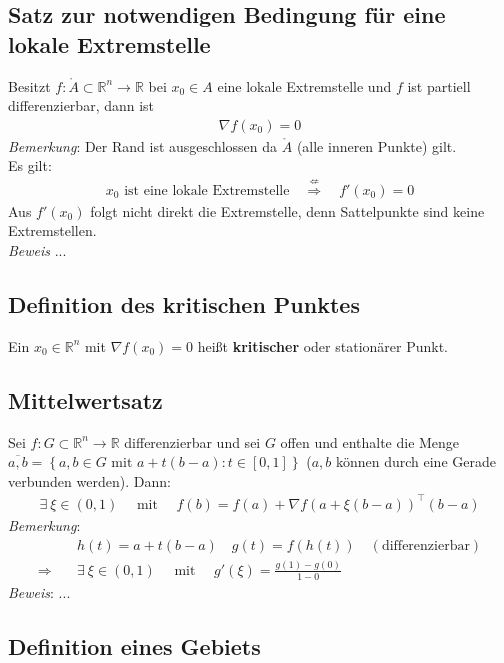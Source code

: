 \documentclass[11pt,a4paper]{book}
\newcommand {\R}	{\mathbb{R}}
\newcommand {\Rn}	{\mathbb{R}^n}
\newcommand{\1}    	{\mathbbm{1}}
\newcommand{\mitt}	{\textrm{ mit }}
\begin{document}
\subsection{Satz zur notwendigen Bedingung für eine lokale Extremstelle}
Besitzt \(f: \mathring{A} \subset \Rn \rightarrow \R \) bei \(x_0 \in A\) eine lokale Extremstelle und \(f\) ist partiell differenzierbar, dann ist
\begin{align*}
	\nabla f(x_0) = 0
\end{align*}
\textit{Bemerkung}: Der Rand ist ausgeschlossen da \(\mathring{A}\) (alle inneren Punkte) gilt.\\
Es gilt:
\begin{align*}
	x_0 \textrm{ ist eine lokale Extremstelle}
	\quad \stackrel{\not\Leftarrow}{\Rightarrow} \quad
	f'(x_0) = 0
\end{align*}
Aus \(f'(x_0)\) folgt nicht direkt die Extremstelle, denn Sattelpunkte sind keine Extremstellen. \\

\noindent
\textit{Beweis} ...

\subsection{Definition des kritischen Punktes}

Ein \(x_0 \in \Rn \) mit \(\nabla f(x_0) = 0\) heißt \textbf{kritischer} oder stationärer Punkt.  

\subsection{Mittelwertsatz}
Sei \(f: G \subset \Rn \rightarrow \R\) differenzierbar und sei \(G\) offen und enthalte die Menge \(\overline{a,b} = \left\{ a,b \in G \mitt  a + t(b-a) : t \in [0,1] \right\}\) (\(a,b\) können durch eine Gerade verbunden werden). Dann:
\begin{align*}
	\exists~ \xi \in (0,1)\quad\mitt\quad f(b) = f(a) + \nabla f(a + \xi(b-a))^\top (b-a) 
\end{align*}
\textit{Bemerkung}:
\begin{align*}
	& h(t) = a + t(b-a) \quad
	g(t) = f(h(t)) \quad (\textrm{differenzierbar}) \\
	\Rightarrow \quad & \exists~ \xi \in (0,1)\quad\mitt\quad g'(\xi) = \frac{g(1) - g(0)}{1-0}
\end{align*}
\textit{Beweis}: ...

\subsection{Definition eines Gebiets}
\end{document}
